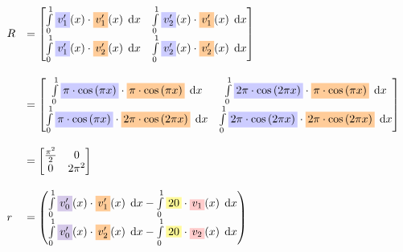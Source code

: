 \documentclass[
final,
a4paper,
oneside,
parskip=full,
headings=standardclasses,
headings=big,
pointednumbers,
fleqn
]{scrartcl}
\newcommand{\tfillb}[1]{\tfillc[#1][blue!20]}
\newcommand{\tfillo}[1]{\tfillc[#1][orange!40]}
\newcommand{\tfilly}[1]{\tfillc[#1][yellow!40]}
\newcommand{\tfillr}[1]{\tfillc[#1][red!20]}
\newcommand{\tfillv}[1]{\tfillc[#1][Violet!20]}
\newcommand*\difx{\; \mathop{}\!\mathrm{d}x}
\newcommand{\f}[2]{\frac{#1}{#2}}
\newcommand{\kl}[1]{{\left( #1 \right)}}
\begin{document}
    {\setlength{\abovedisplayskip}{-6pt}
    \setlength{\belowdisplayskip}{-12pt}
    \begin{align*}
        \begin{array}{ll}
            R & = \begin{bmatrix}
                \int\limits_{0}^{1}{\tfillb{$v_1'$}\kl{x} \cdot \tfillo{$v_1'$}\kl{x} \difx} &
                \int\limits_{0}^{1}{\tfillb{$v_2'$}\kl{x} \cdot \tfillo{$v_1'$}\kl{x} \difx} \\
                \int\limits_{0}^{1}{\tfillb{$v_1'$}\kl{x} \cdot \tfillo{$v_2'$}\kl{x} \difx} & 
                \int\limits_{0}^{1}{\tfillb{$v_2'$}\kl{x} \cdot \tfillo{$v_2'$}\kl{x} \difx} \\
            \end{bmatrix} \\
            & \\
            & = \begin{bmatrix}
                \int\limits_{0}^{1}{\tfillb{$\pi \cdot \cos\kl{\pi x}$}     \cdot \tfillo{$\pi \cdot \cos\kl{\pi x}$} \difx} &
                \int\limits_{0}^{1}{\tfillb{$2 \pi \cdot \cos\kl{2 \pi x}$} \cdot \tfillo{$\pi \cdot \cos\kl{\pi x}$} \difx} \\
                \int\limits_{0}^{1}{\tfillb{$\pi \cdot \cos\kl{\pi x}$}     \cdot \tfillo{$2 \pi \cdot \cos\kl{2 \pi x}$} \difx} & 
                \int\limits_{0}^{1}{\tfillb{$2 \pi \cdot \cos\kl{2 \pi x}$} \cdot \tfillo{$2 \pi \cdot \cos\kl{2 \pi x}$} \difx} \\
            \end{bmatrix} \\
            & \\
            & = \begin{bmatrix}
                \f{\pi^2}{2} & 0 \\
                0             & 2\pi^2
            \end{bmatrix} \\
            & \\
            r & = \begin{pmatrix}
                \int\limits_{0}^{1}{\tfillv{$v_0'$}\kl{x} \cdot \tfillo{$v_1'$}\kl{x} \difx} -
                \int\limits_{0}^{1}{\tfilly{$20$}         \cdot \tfillr{$v_1$}\kl{x} \difx} \\
                \int\limits_{0}^{1}{\tfillv{$v_0'$}\kl{x} \cdot \tfillo{$v_2'$}\kl{x} \difx} -
                \int\limits_{0}^{1}{\tfilly{$20$}         \cdot \tfillr{$v_2$}\kl{x} \difx}
            \end{pmatrix} \\

\end{array}
\end{align*}}
\end{document}
